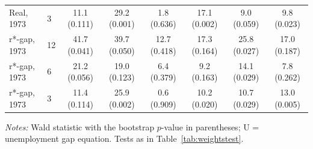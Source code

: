 \begin{table}[tp]
{\begin{tabular}{llcccccc}
Real, 1973 & 3 & 11.1 (0.111) & 29.2 (0.001) & 1.8 (0.636) & 17.1 (0.002) & 9.0 (0.059) & 9.8 (0.023)\\
r*-gap, 1973 & 12 & 41.7 (0.041) & 39.7 (0.050) & 12.7 (0.418) & 17.3 (0.164) & 25.8 (0.027) & 17.0 (0.187)\\
r*-gap, 1973 & 6 & 21.2 (0.056) & 19.0 (0.123) & 6.4 (0.379) & 9.2 (0.163) & 14.1 (0.029) & 7.8 (0.262)\\
r*-gap, 1973 & 3 & 11.4 (0.114) & 25.9 (0.002) & 0.6 (0.909) & 10.2 (0.020) & 10.7 (0.029) & 13.0 (0.005)\\
\bottomrule\end{tabular}
}
\begin{flushleft}\footnotesize\textit{Notes:} Wald statistic with the bootstrap $p$-value in parentheses; U = unemployment gap equation. Tests as in Table~\ref{tab:weightstest}.\end{flushleft}
\end{table}
